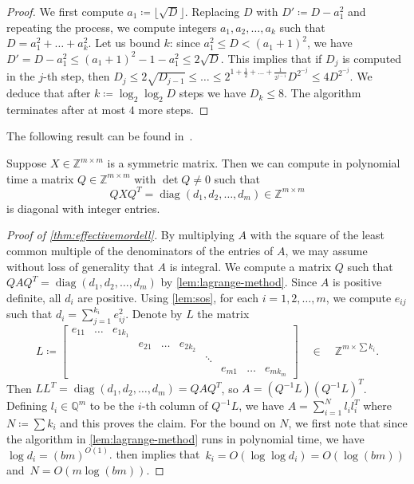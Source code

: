 \documentclass[a4paper,USenglish,cleveref,numberwithinsect]{lipics-v2021}
\DeclareMathOperator{\poly}{poly}
\DeclareMathOperator{\diag}{diag}
\newcommand{\QQ}{\mathbb{Q}}
\newcommand{\ZZ}{\mathbb{Z}}
\numberwithin{equation}{section}
\begin{document}
\begin{proof}
We first compute %
$a_1\coloneqq\lfloor\sqrt{D}\rfloor$.
Replacing $D$ with $D'\coloneqq D-a_1^2$ and repeating the process,
we compute integers $a_1,a_2,\dots,a_k$ such that
$D=a_1^2+\dots+a_k^2$. Let us bound $k$:
since $a_1^2 \leq D < (a_1+1)^2$, we have $D'=D-a_1^2 \leq (a_1+1)^2-1 -a_1^2 \leq 2 \sqrt{D}$.
This implies that if $D_j$ is computed in the $j$-th step, then
$D_j \leq 2\sqrt{D_{j-1}}\leq\dots\leq 2^{1+\frac{1}{2}+\dots+\frac{1}{2^{j-1}}}D^{2^{-j}}\leq 4 D^{2^{-j}}$.
We deduce that after $k\coloneqq\log_2\log_2 D$ steps we have $D_{k}\leq 8$.
The algorithm terminates after at most $4$ more steps.
\end{proof}

The following result can be found in~\cite[Algorithm~12.1]{schaum-lin-alg}.

\begin{lemma}\label{lem:lagrange-method}
Suppose $X\in\ZZ^{m\times m}$ is a symmetric matrix.
Then %
we can compute  in polynomial time
a matrix $Q\in\ZZ^{m\times m}$ with $\det Q\neq 0$ such that
\[
	Q X Q^T = \diag(d_1,d_2,\dots,d_m)\in\ZZ^{m\times m}
\] is diagonal with integer entries.
\end{lemma}

\begin{proof}[Proof of \cref{thm:effectivemordell}]
By multiplying $A$ with the square of the least common multiple of the denominators of the entries of $A$, we may assume without loss of generality that $A$ is integral. We compute a matrix $Q$ such that $QAQ^T = \diag(d_1,d_2,\dots,d_m)$
by \cref{lem:lagrange-method}.
Since $A$ is positive definite, all $d_i$ are positive.
Using \cref{lem:sos}, for each $i=1,2,\dots,m$,
we compute $e_{ij}$ such that $d_i = \sum_{j=1}^{k_i} e_{ij}^2$.
Denote by $L$ the matrix
\[
L \coloneqq \begin{bmatrix}
e_{11} & \dots & e_{1 k_1} &          &         &          &    & & &   \\
       &       &           & e_{21}   & \dots   & e_{2k_2} &    & & & \\
  	   &       &           &          &         &          &\ddots & & &\\
       &       &           &          &         &          &       & e_{m1}& \dots & e_{mk_m}
	\end{bmatrix}\quad\in\quad \ZZ^{m\times \sum k_i}.
\]
Then $LL^T=\diag(d_1,d_2,\dots,d_m)=QAQ^T$, so $A = (Q^{-1}L) (Q^{-1}L)^{T}$.
Defining $l_i\in\QQ^m$ to be the $i$-th column of $Q^{-1}L$,
we have $A=\sum_{i=1}^N l_i l_i^T$ where $N\coloneqq \sum k_i$ and this proves the claim. For the bound on $N$,
we first note that since the algorithm in \cref{lem:lagrange-method} runs in polynomial time,
we have %
$\log d_i = (bm)^{O(1)}$.
 then implies that~$k_i = O(\log\log d_i) = O(\log(bm))$ and~$N = O(m\log(bm))$.
\end{proof}
\end{document}
